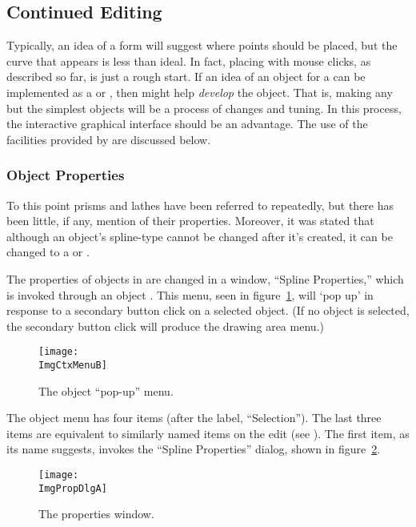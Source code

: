 		\subsection{Continued Editing}%
		\label{ssec:cont_editing}
		Typically, an idea
		of a form will suggest where points should be
		placed, but the curve that appears is less than
		ideal. In fact, placing
		 with mouse clicks, as described
		so far, is just a rough start. If an idea of an
		object for a \IXpov{}  can be
		implemented as a \IXpov{} \IXprism{} or
		\IXlathe{}, then \IXpkg{} might help
		\emph{develop} the object. That is, making
		any but the simplest objects will be a process
		of changes and tuning. In this process, the
		interactive graphical interface should be
		an advantage. The use of the facilities
		provided by \IXpkg{} are discussed below.
		
			\subsubsection{Object Properties}%
			\label{sssec:object_props}
			To this point prisms and lathes have been
			referred to repeatedly, but there has been
			little, if any, mention of their properties.
			Moreover, it was stated that although an
			object's spline-type cannot be changed after
			it's created, it can be changed to a \IXprism{}
			or \IXlathe{}.
			
			The properties of objects in \IXpkg{}
			are changed in a  window,
			``Spline Properties,'' which is invoked
			through an object . This menu,
			seen in figure~\ref{fig:object_popup_menu},
			will `pop up' in response to a secondary
			button click on a selected object.
			(If no object is selected, the secondary
			button click will produce the drawing area
			menu.)
			
			\begin{figure}[htb!]
			\centering
			\texttt{[image: \\ImgCtxMenuB]}
			\caption{The object ``pop-up'' menu.}
			\label{fig:object_popup_menu}
			\end{figure}

			The object menu has four items (after the label,
			``Selection''). The last three items are
			equivalent to similarly named items on the
			edit  (see ).
			The first item, as its name suggests, invokes
			the ``Spline Properties'' dialog, shown in
			figure~\ref{fig:props_dlg}.

			\begin{figure}[htb!]
			\centering
			\texttt{[image: \\ImgPropDlgA]}
			\caption{The properties window.}
			\label{fig:props_dlg}
			\end{figure}
			
